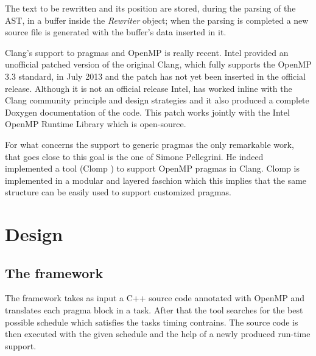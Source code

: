 \documentclass[a4paper,12pt,oneside]{book}
\begin{document}
The text to be rewritten and its position are stored, during the parsing of the AST, in a buffer inside the \emph{Rewriter} object; when the parsing is completed a new source file is generated with the buffer’s data inserted in it.  

Clang’s support to pragmas and OpenMP is really recent. Intel provided an unofficial patched version of the original Clang, which fully supports the OpenMP 3.3 standard, in July 2013 and the patch has not yet been inserted in the official release. Although it is not an official release Intel, has worked inline with the Clang community principle and design strategies and it also produced a complete Doxygen documentation of the code. This patch works jointly with the Intel OpenMP Runtime Library \cite{intelomprtl} which is open-source. 

For what concerns the support to generic pragmas the only remarkable work, that goes close to this goal is the one of Simone Pellegrini. He indeed implemented a tool (Clomp \cite{clomp}) to support OpenMP pragmas in Clang. Clomp is implemented in a modular and layered faschion which this implies that the same structure can be easily used to support customized pragmas.
 



\chapter{Design}
\section{The framework}

The framework takes as input a C++ source code annotated with OpenMP and translates each pragma block in a task. After that the tool searches for the best possible schedule which satisfies the tasks timing contrains. The source code is then executed with the given schedule and the help of a newly produced run-time support.
\end{document}
